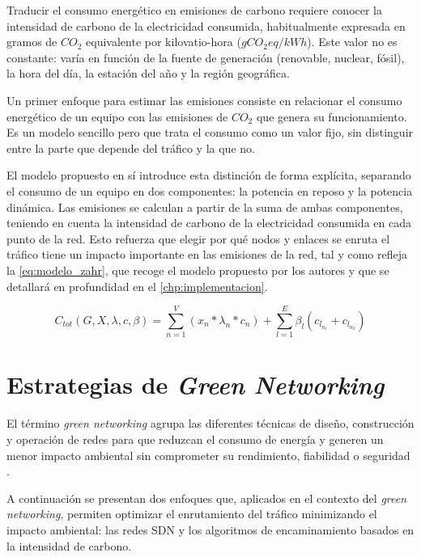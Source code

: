 Traducir el consumo energético en emisiones de carbono requiere conocer la intensidad de carbono de la electricidad consumida, habitualmente expresada en gramos de $CO_2$ equivalente por kilovatio-hora ($gCO_2eq/kWh$). Este valor no es constante: varía en función de la fuente de generación (renovable, nuclear, fósil), la hora del día, la estación del año y la región geográfica.

Un primer enfoque para estimar las emisiones consiste en relacionar el consumo energético de un equipo con las emisiones de $CO_2$ que genera su funcionamiento. Es un modelo sencillo pero que trata el consumo como un valor fijo, sin distinguir entre la parte que depende del tráfico y la que no.

El modelo propuesto en \cite{ElZahr2023} sí introduce esta distinción de forma explícita, separando el consumo de un equipo en dos componentes: la potencia en reposo y la potencia dinámica. Las emisiones se calculan a partir de la suma de ambas componentes, teniendo en cuenta la intensidad de carbono de la electricidad consumida en cada punto de la red. Esto refuerza que elegir por qué nodos y enlaces se enruta el tráfico tiene un impacto importante en las emisiones de la red, tal y como refleja la \autoref{eq:modelo_zahr}, que recoge el modelo propuesto por los autores y que se detallará en profundidad en el \autoref{chp:implementacion}.

\begin{equation}\label{eq:modelo_zahr}
    C_{tot}(G, X, \lambda, c, \beta) = \sum_{n=1}^{V} (x_n * \lambda_n * c_n) + \sum_{l=1}^{E} \beta_l (c_{l_{n_1}} + c_{l_{n_2}})
\end{equation}

\section{Estrategias de \textit{Green Networking}}

El término \textit{green networking} agrupa las diferentes técnicas de diseño, construcción y operación de redes para que reduzcan el consumo de energía y generen un menor impacto ambiental sin comprometer su rendimiento, fiabilidad o seguridad \cite{bianzino2012survey}.

A continuación se presentan dos enfoques que, aplicados en el contexto del \textit{green networking}, permiten optimizar el enrutamiento del tráfico minimizando el impacto ambiental: las redes SDN y los algoritmos de encaminamiento basados en la intensidad de carbono.

